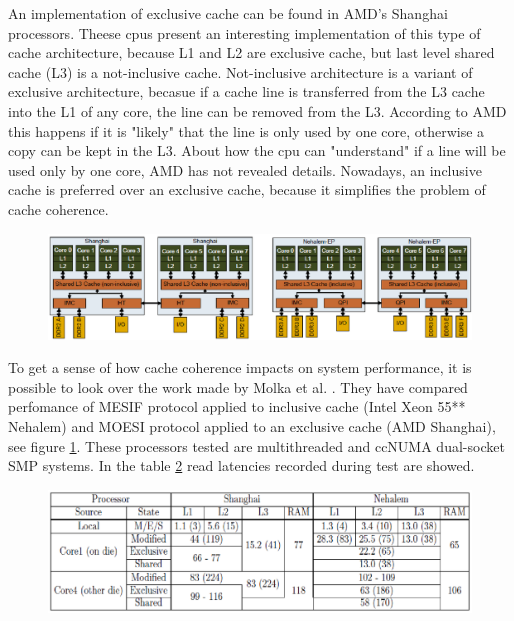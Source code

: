 An implementation of exclusive cache can be found in AMD's Shanghai processors. Theese cpus present an interesting implementation of this type of cache
architecture, because L1 and L2 are exclusive cache, but last level shared cache (L3) is a not-inclusive cache.
Not-inclusive architecture is a variant of exclusive architecture, becasue if a cache line is transferred from the L3 cache into the L1 of any core, the 
line can be removed from the L3. According to AMD this happens if it is "likely" that the line is only used by one core, otherwise a copy can be kept in 
the L3. About how the cpu can "understand" if a line will be used only by one core, AMD has not revealed details. Nowadays, an inclusive cache is 
preferred over an exclusive cache, because it simplifies the problem of cache coherence. 

\begin{figure}[htbp]
\centering
\includegraphics[width=\widefigure]{images/neh_amd.eps}
\caption{}
\label{fig:neh_amd}
\end{figure}

To get a sense of how cache coherence impacts on system performance, it is possible to look over the work made by 
Molka et al. \cite{molka}. They have compared perfomance of MESIF protocol applied to inclusive cache (Intel Xeon 55** Nehalem) and MOESI protocol applied 
to an exclusive cache (AMD Shanghai), see figure \ref{fig:neh_amd}. These processors tested are multithreaded and ccNUMA dual-socket SMP systems. 
In the table \ref{fig:tab_lat} read latencies recorded during test are showed.

\begin{figure}[htbp]
\centering
\includegraphics[width=\widefigure]{images/tab_lat.eps}
\caption{}
\label{fig:tab_lat}
\end{figure}

